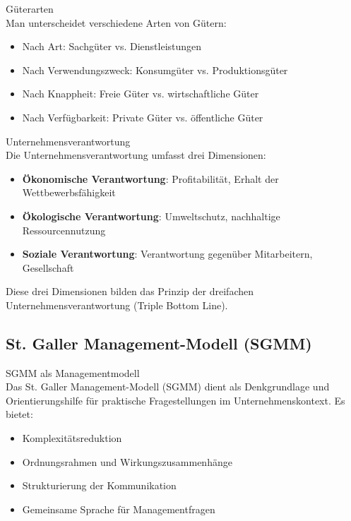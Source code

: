 \begin{definition}{Güterarten}\\
Man unterscheidet verschiedene Arten von Gütern:
\begin{itemize}
    \item Nach Art: Sachgüter vs. Dienstleistungen
    \item Nach Verwendungszweck: Konsumgüter vs. Produktionsgüter
    \item Nach Knappheit: Freie Güter vs. wirtschaftliche Güter
    \item Nach Verfügbarkeit: Private Güter vs. öffentliche Güter
\end{itemize}
\end{definition}

\begin{definition}{Unternehmensverantwortung}\\
Die Unternehmensverantwortung umfasst drei Dimensionen:
\begin{itemize}
    \item \textbf{Ökonomische Verantwortung}: Profitabilität, Erhalt der Wettbewerbsfähigkeit
    \item \textbf{Ökologische Verantwortung}: Umweltschutz, nachhaltige Ressourcennutzung
    \item \textbf{Soziale Verantwortung}: Verantwortung gegenüber Mitarbeitern, Gesellschaft
\end{itemize}
Diese drei Dimensionen bilden das Prinzip der dreifachen Unternehmensverantwortung (Triple Bottom Line).
\end{definition}

\subsection{St. Galler Management-Modell (SGMM)}

\begin{concept}{SGMM als Managementmodell}\\
Das St. Galler Management-Modell (SGMM) dient als Denkgrundlage und Orientierungshilfe für praktische Fragestellungen im Unternehmenskontext. Es bietet:
\begin{itemize}
    \item Komplexitätsreduktion
    \item Ordnungsrahmen und Wirkungszusammenhänge
    \item Strukturierung der Kommunikation
    \item Gemeinsame Sprache für Managementfragen
\end{itemize}
\end{concept}

